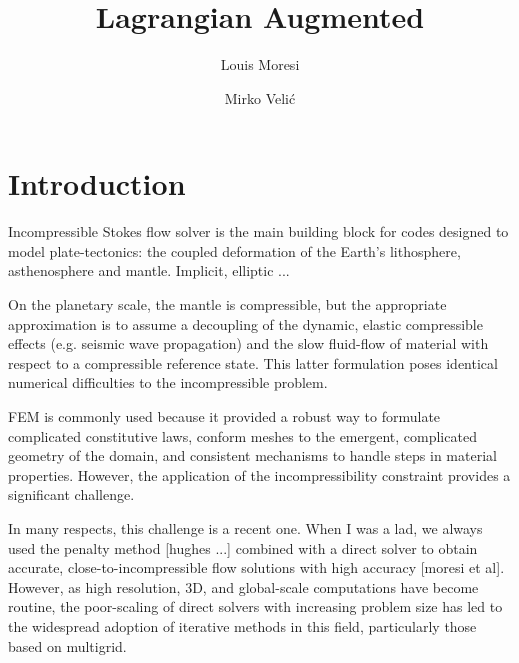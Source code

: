 \documentclass[]{svjour3}
\begin{document}
\title{Lagrangian Augmented}
\author{ Louis Moresi \and Mirko Veli\'c}


\maketitle




\section{Introduction}

Incompressible Stokes flow solver is the main building block for codes designed to model plate-tectonics: the coupled deformation
of the Earth's lithosphere, asthenosphere and mantle.  Implicit, elliptic ... 

On the planetary scale, the mantle is compressible, but the appropriate approximation is to assume a decoupling
of the dynamic, elastic compressible effects (e.g. seismic wave propagation) and the slow fluid-flow of material
with respect to a compressible reference state. This latter formulation poses identical numerical difficulties to
the incompressible problem.

FEM is commonly used because it provided a robust way to formulate complicated constitutive laws, conform meshes to
the emergent, complicated geometry of the domain, and consistent mechanisms to handle steps in material properties.
However, the application of the incompressibility constraint provides a significant challenge.

In many respects, this challenge is a recent one. When I was a lad, we always used the penalty method [hughes ...]
combined with a direct solver to obtain accurate, close-to-incompressible flow solutions with high accuracy [moresi et al].
However, as high resolution, 3D, and global-scale computations have become routine, the poor-scaling of direct
solvers with increasing problem size has led to the widespread adoption of iterative methods in this field, 
particularly those based on multigrid. 
\end{document}
